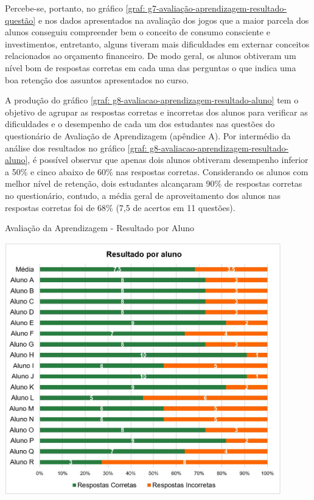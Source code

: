 Percebe-se, portanto, no gráfico \ref{graf: g7-avaliação-aprendizagem-resultado-questão} e nos dados apresentados na avaliação dos jogos que a maior parcela dos alunos conseguiu compreender bem o conceito de consumo consciente e investimentos, entretanto, alguns tiveram mais dificuldades em externar conceitos relacionados ao orçamento financeiro. De modo geral, os alunos obtiveram um nível bom de respostas corretas em cada uma das perguntas o que indica uma boa retenção dos assuntos apresentados no curso.

A produção do gráfico \ref{graf: g8-avaliacao-aprendizagem-resultado-aluno} tem o objetivo de agrupar as respostas corretas e incorretas dos alunos para verificar as dificuldades e o desempenho de cada um dos estudantes nas questões do questionário de Avaliação de Aprendizagem (apêndice A). Por intermédio da análise dos resultados no gráfico \ref{graf: g8-avaliacao-aprendizagem-resultado-aluno}, é possível observar que apenas dois alunos obtiveram desempenho inferior a 50\% e cinco abaixo de 60\% nas respostas corretas. Considerando os alunos com melhor nível de retenção, dois estudantes alcançaram 90\% de respostas corretas no questionário, contudo, a média geral de aproveitamento dos alunos nas respostas corretas foi de 68\% (7,5 de acertos em 11 questões).

\graphicspath{{graficos/}} 
\begin{grafico}[!ht]
\centering
\begin{minipage}{0.8\textwidth}
\caption{Avaliação da Aprendizagem - Resultado por Aluno}
\centering
\includegraphics[width=0.9\textwidth]{g8-avaliacao-aprendizagem-resultado-aluno}
\label{graf: g8-avaliacao-aprendizagem-resultado-aluno}
\end{minipage}
\end{grafico}

